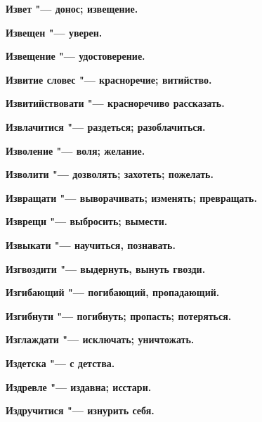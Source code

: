 \begin{multicols}{2}
\bfseries Извет\normalfont{} "--- донос; извещение. 




\bfseries Извещен\normalfont{} "--- уверен. 




\bfseries Извещение\normalfont{} "--- удостоверение. 




\bfseries Извитие словес\normalfont{} "--- красноречие; витийство. 




\bfseries Извитийствовати\normalfont{} "--- красноречиво рассказать. 




\bfseries Извлачитися\normalfont{} "--- раздеться; разоблачиться. 




\bfseries Изволение\normalfont{} "--- воля; желание. 




\bfseries Изволити\normalfont{} "--- дозволять; захотеть; пожелать. 




\bfseries Извращати\normalfont{} "--- выворачивать; изменять; превращать. 




\bfseries Изврещи\normalfont{} "--- выбросить; вымести. 




\bfseries Извыкати\normalfont{} "--- научиться, познавать. 




\bfseries Изгвоздити\normalfont{} "--- выдернуть, вынуть гвозди. 




\bfseries Изгибающий\normalfont{} "--- погибающий, пропадающий. 




\bfseries Изгибнути\normalfont{} "--- погибнуть; пропасть; потеряться. 




\bfseries Изглаждати\normalfont{} "--- исключать; уничтожать. 




\bfseries Издетска\normalfont{} "--- с детства. 




\bfseries Издревле\normalfont{} "--- издавна; исстари. 




\bfseries Издручитися\normalfont{} "--- изнурить себя. 





\end{multicols}
